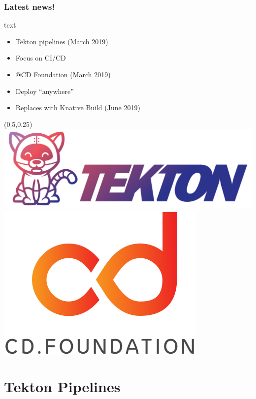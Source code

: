 \documentclass[aspectratio=169,11pt,hyperref={colorlinks=true}]{beamer}
\begin{document}
\begin{lblackrwhiteframe}
\begin{lblackrwhiteframe}
\begin{lblackrwhiteframe}
  \frametitle{Latest news!}
  \large
  \begin{beamercolorbox}[wd=0.3\paperwidth]{text}
    \begin{itemize}
      \item Tekton pipelines (March 2019)
      \item Focus on CI/CD
      \item @CD Foundation  (March 2019)
      \item Deploy ``anywhere''
      \item Replaces with Knative Build (June 2019)
    \end{itemize}
  \end{beamercolorbox}%
  \begin{textblock*}{0.5\paperwidth}(0.5\paperwidth,0.25\paperheight)
    \centering
    \includegraphics[width=0.35\paperwidth]{img/tekton-horizontal-color.png}
    \includegraphics[width=0.20\paperwidth]{img/cdf-color.png}
  \end{textblock*}
\end{lblackrwhiteframe}

\section{Tekton Pipelines}


\end{lblackrwhiteframe}
\end{lblackrwhiteframe}
\end{document}
